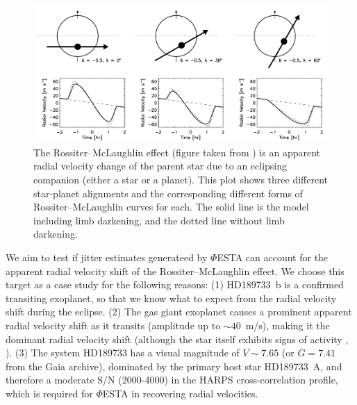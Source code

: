 \begin{figure}[htbp]
\centering
\includegraphics[width = 0.80 \linewidth]
{./Figures/Methods/rmeffect.png}
\caption[The Rossiter–McLaughlin effect]
{The Rossiter–McLaughlin effect (figure taken from \cite{Gaudi2007}) is an apparent radial velocity change of the parent star due to an eclipsing companion (either a star or a planet). This plot shows three different star-planet alignments and the corresponding different forms of Rossiter–McLaughlin curves for each. The solid line is the model including limb darkening, and the dotted line without limb darkening.}
\label{fig:rm-effect}
\end{figure} 

We aim to test if jitter estimates generateed by $\mathit{\Phi}$ESTA can account for the apparent radial velocity shift of the Rossiter–McLaughlin effect. We choose this target as a case study for the following reasons: (1) HD189733~b is a confirmed transiting exoplanet, so that we know what to expect from the radial velocity shift during the eclipse. (2) The gas giant exoplanet causes a prominent apparent radial velocity shift as it transits (amplitude up to $\sim 40$~m/s), making it the dominant radial velocity shift (although the star itself exhibits signs of activity \cite{Boisse189733}, \cite{Cauley2017}). (3) The system HD189733 has a visual magnitude of $V\sim7.65$ \cite{SIMBAD189733} (or $G=7.41$ from the Gaia archive), dominated by the primary host star HD189733~A, and therefore a moderate S/N (2000-4000) in the HARPS cross-correlation profile, which is required for $\mathit{\Phi}$ESTA in recovering radial velocities.


